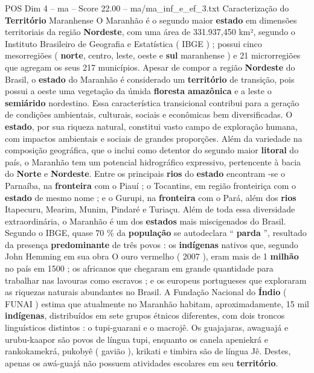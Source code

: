 \begin{textsample}{POS Dim 4 – ma – Score 22.00 – ma/ma\_inf\_e\_ef\_3.txt}  \label{ex:f4_pos_051}
Caracterização do \textbf{Território} Maranhense O Maranhão é o segundo maior \textbf{estado} em dimensões territoriais da região \textbf{Nordeste}, com uma área de 331.937,450 km², segundo o Instituto Brasileiro de Geografia e Estatística ( IBGE ) ; possui cinco mesorregiões ( \textbf{norte}, centro, leste, oeste e \textbf{sul} maranhense ) e 21 microrregiões que agregam os seus 217 municípios.
Apesar de compor a região \textbf{Nordeste} do Brasil, o \textbf{estado} do Maranhão é considerado um \textbf{território} de transição, pois possui a oeste uma vegetação da úmida \textbf{floresta} \textbf{amazônica} e a leste o \textbf{semiárido} nordestino.
Essa característica transicional contribui para a geração de condições ambientais, culturais, sociais e econômicas bem diversificadas.
O \textbf{estado}, por sua riqueza natural, constitui vasto campo de exploração humana, com impactos ambientais e sociais de grandes proporções.
Além da variedade na composição geográfica, que o inclui como detentor do segundo maior \textbf{litoral} do país, o Maranhão tem um potencial hidrográfico expressivo, pertencente à bacia do \textbf{Norte} e \textbf{Nordeste}.
Entre os principais \textbf{rios} do \textbf{estado} encontram -se o Parnaíba, na \textbf{fronteira} com o Piauí ; o Tocantins, em região fronteiriça com o \textbf{estado} de mesmo nome ; e o Gurupi, na \textbf{fronteira} com o Pará, além dos \textbf{rios} Itapecuru, Mearim, Munim, Pindaré e Turiaçu.
Além de toda essa diversidade extraordinária, o Maranhão é um dos \textbf{estados} mais miscigenados do Brasil.
Segundo o IBGE, quase 70 \% da \textbf{população} se autodeclara “ \textbf{parda} ”, resultado da presença \textbf{predominante} de três povos : os \textbf{indígenas} nativos que, segundo John Hemming em sua obra O ouro vermelho ( 2007 ), eram mais de 1 \textbf{milhão} no país em 1500 ; os africanos que chegaram em grande quantidade para trabalhar nas lavouras como escravos ; e os europeus portugueses que exploraram as riquezas naturais abundantes no Brasil.
A Fundação Nacional do \textbf{Índio} ( FUNAI ) estima que atualmente no Maranhão habitam, aproximadamente, 15 mil \textbf{indígenas}, distribuídos em sete grupos étnicos diferentes, com dois troncos linguísticos distintos : o tupi-guarani e o macrojê.
Os guajajaras, awaguajá e urubu-kaapor são povos de língua tupi, enquanto os canela apeniekrá e rankokamekrá, pukobyê ( gavião ), krikati e timbira são de língua Jê.
Destes, apenas os awá-guajá não possuem atividades escolares em seu \textbf{território}.

\end{textsample}
